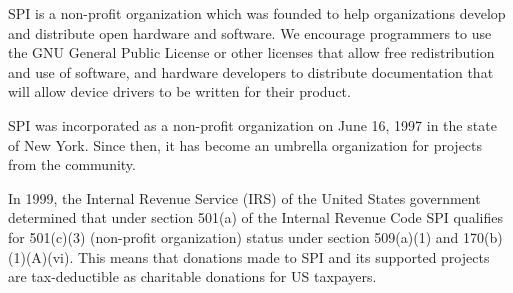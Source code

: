 \documentclass[a4paper]{report}
\begin{document}
SPI is a non-profit organization which was founded to help organizations
develop and distribute open hardware and software. We encourage programmers
to use the GNU General Public License or other licenses that allow free
redistribution and use of software, and hardware developers to distribute
documentation that will allow device drivers to be written for their product.

SPI was incorporated as a non-profit organization on June 16, 1997 in the state
of New York. Since then, it has become an umbrella organization for projects
from the community.

In 1999, the Internal Revenue Service (IRS) of the United States government
determined that under section 501(a) of the Internal Revenue Code SPI
qualifies for 501(c)(3) (non-profit organization) status under section 509(a)(1)
and 170(b)(1)(A)(vi). This means that donations made to SPI and its
supported projects are tax-deductible as charitable donations for US taxpayers.

\newpage

\pagestyle{empty}


\null
\end{document}
